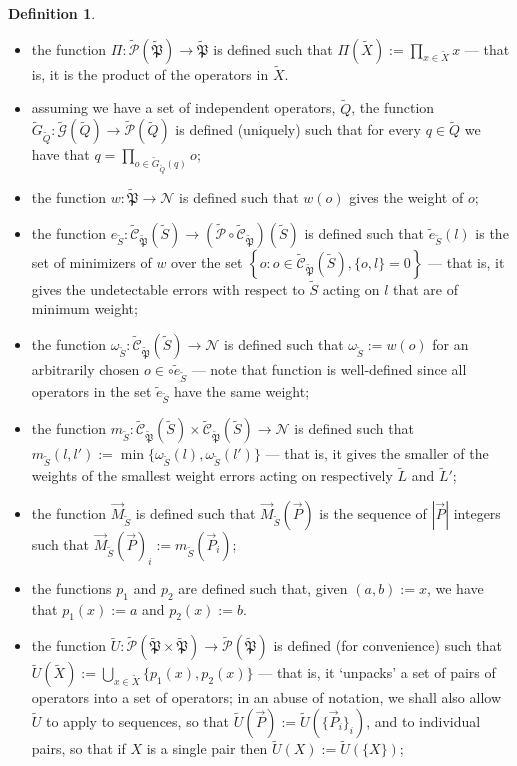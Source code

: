 \documentclass[12pt]{amsbook}
\theoremstyle{plain}
\theoremstyle{definition}
\newtheorem{definition}{Definition}
\theoremstyle{remark}
\newcommand{\lst}{\vec}
\newcommand{\set}{\tilde}
\newcommand{\genfun}{\tilde{\mathcal{G}}}
\newcommand{\pauligroup}{{\set{\mathfrak{P}}}}
\newcommand{\powerset}{\set{\mathcal{P}}}
\newcommand{\centralizer}{\set{\mathcal{C}}}
\newcommand{\om}{\omega}
\newcommand{\paren}[1]{\left(#1\right)}
\begin{document}
\begin{definition}
$\quad$

\begin{itemize}
\item the function $\Pi:\powerset(\pauligroup)\to\pauligroup$ is defined such that $\Pi(\set X):=\prod_{x\in \set X} x$ --- that is, it is the product of the operators in $\set X$.
\item assuming we have a set of independent operators, $\set Q$, the function $\set G_{\set Q}:\genfun(\set Q)\to\powerset(\set Q)$ is defined (uniquely) such that for every $q\in\set Q$ we have that $q=\prod_{o\in\set G_{\set Q}(q)} o$;
\item the function $w:\pauligroup\to \mathscr{N}$ is defined such that $w(o)$ gives the weight of $o$;
\item the function $e_{\set S}:\centralizer_\pauligroup\paren{\set S}\to \paren{\powerset\circ\centralizer_\pauligroup}\paren{\set S}$ is defined such that $\set e_{\set S}(l)$ is the set of minimizers of $w$ over the set $\left\{o: o\in \centralizer_\pauligroup\paren{\set S}, \{o,l\}=0\right\}$ --- that is, it gives the undetectable errors with respect to $\set S$ acting on $l$ that are of minimum weight;
\item the function $\om_{\set S}:\centralizer_\pauligroup\paren{\set S}\to\mathscr{N}$ is defined such that $\om_{\set S}:=w(o)$ for an arbitrarily chosen $o\in\circ \set e_{\set S}$ --- note that function is well-defined since all operators in the set $\set e_{\set S}$ have the same weight;
\item the function $m_{\set S}:\centralizer_\pauligroup\paren{\set S}\times \centralizer_\pauligroup\paren{\set S} \to \mathscr{N}$ is defined such that $m_{\set S}(l,l'):=\min \{\om_{\set S}(l),\om_{\set S}(l')\}$ --- that is, it gives the smaller of the weights of the smallest weight errors acting on respectively $\set L$ and $\set L'$;
\item the function $\lst M_{\set S}$ is defined such that $\lst M_{\set S}\paren{\lst P}$ is the sequence of $|\lst P|$ integers such that $\lst M_{\set S}\paren{\lst P}_i := m_{\set S}\paren{\lst P_i}$;
\item the functions $p_1$ and $p_2$ are defined such that, given $(a,b):=x$, we have that $p_1(x):=a$ and $p_2(x):=b$.
\item the function $\set U:\powerset(\pauligroup\times\pauligroup)\to\powerset(\pauligroup)$ is defined (for convenience) such that $\set U\paren{\set X}:=\bigcup_{x\in\set X} \{p_1(x),p_2(x)\}$ --- that is, it `unpacks' a set of pairs of operators into a set of operators;  in an abuse of notation, we shall also allow $\set U$ to apply to sequences, so that $\set U(\lst P) := \set U\paren{\{\lst P_i\}_i}$, and to individual pairs, so that if $X$ is a single pair then $\set U(X) := \set U(\{X\})$;

\end{itemize}
\end{definition}
\end{document}
